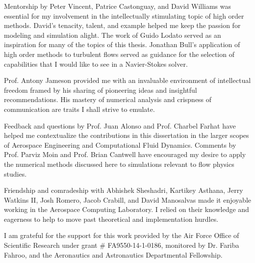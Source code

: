 
Mentorship by Peter Vincent, Patrice Castonguay, and David Williams was essential for my involvement in the intellectually stimulating topic of high order methods. David's tenacity, talent, and example helped me keep the passion for modeling and simulation alight. The work of Guido Lodato served as an inspiration for many of the topics of this thesis. Jonathan Bull's application of high order methods to turbulent flows served as guidance for the selection of capabilities that I would like to see in a Navier-Stokes solver.

Prof. Antony Jameson provided me with an invaluable environment of intellectual freedom framed by his sharing of pioneering ideas and insightful recommendations. His mastery of numerical analysis and crispness of communication are traits I shall strive to emulate.

Feedback and questions by Prof. Juan Alonso and Prof. Charbel Farhat have helped me contextualize the contributions in this dissertation in the larger scopes of Aerospace Engineering and Computational Fluid Dynamics. Comments by Prof. Parviz Moin and Prof. Brian Cantwell have encouraged my desire to apply the numerical methods discussed here to simulations relevant to flow physics studies.

Friendship and comradeship with Abhishek Sheshadri, Kartikey Asthana, Jerry Watkins II, Josh Romero, Jacob Crabill, and David Manosalvas made it enjoyable working in the Aerospace Computing Laboratory. I relied on their knowledge and eagerness to help to move past theoretical and implementation hurdles.

I am grateful for the support for this work provided by the Air Force Office of Scientific Research under grant \# FA9550-14-1-0186, monitored by Dr. Fariba Fahroo, and the Aeronautics and Astronautics Departmental Fellowship.